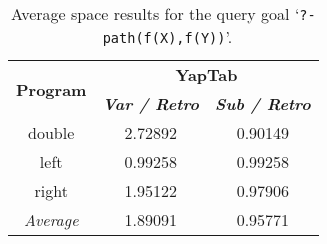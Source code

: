 \begin{table}[ht]
\centering
  \begin{tabular}{ccc}
   \hline
    \hline
    \multirow{2}{*}{\textbf{Program}} & \multicolumn{2}{c}{\textbf{YapTab}} \\
    & \textbf{\textit{\small{Var / Retro}}} & \textbf{\textit{\small{Sub / Retro}}} \\
   \hline
   \hline
double & 2.72892 & 0.90149 \\
left & 0.99258 & 0.99258 \\
right & 1.95122 & 0.97906 \\
\hline
\hline
\textit{Average} & 1.89091 &  0.95771 \\
\hline
\hline
\end{tabular}
\caption{Average space results for the query goal `\texttt{?-~path(f(X),f(Y))}'.}
\label{tbl:results_average_stst_space}
\end{table}

